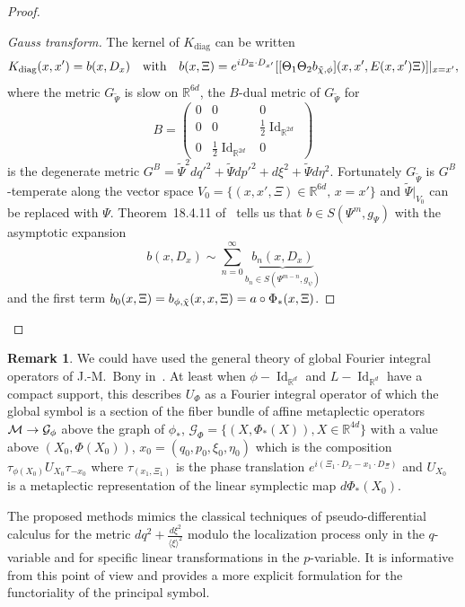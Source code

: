 \documentclass[10pt]{amsart}
\theoremstyle{definition}\newtheorem{defi}[theo]{Definition}\newtheorem{rema}[theo]{Remark}\newtheorem{exam}[theo]{Example}\newtheorem{exem}[theo]{Example}\newtheorem{nota}[theo]{Notation}
\newcommand{\R}{\mathbb{R}}
\newcommand{\clG}{\mathcal{G}}
\newcommand{\clM}{\mathcal{M}}
\DeclareMathOperator{\Idd}{Id}
\DeclareMathOperator{\diag}{diag}
\let\oldtilde\tilde
\renewcommand*{\tilde}[1]{\mathchoice{\widetilde{#1}}{\widetilde{#1}}{\oldtilde{#1}}{\oldtilde{#1}}}
\let\originalleft\left
\let\originalright\right
\renewcommand{\left}{\mathopen{}\mathclose\bgroup\originalleft}
\renewcommand{\right}{\aftergroup\egroup\originalright}
\renewcommand*{\to}{\mathchoice{\longrightarrow}{\rightarrow}{\rightarrow}{\rightarrow}}
\begin{document}
\begin{proof}
\begin{proof}[{Gauss transform}]
The kernel of $K_{\diag}$ can be written
\[
K_{\diag}(x,x')=b(x,D_{x})\quad\text{with}\quad b(x,\Xi)=e^{iD_{\Xi}\cdot
D_{x'}}
\left[[\Theta_{1}\Theta_{2}b_{\tilde\chi,\phi}](x,x',E(x,x')\Xi)\right]|_{x=x'},
\]
where the metric $G_{\widetilde{\Psi}}$ is slow on $\R^{6d}$, the $B$-dual metric of $G_{\widetilde{\Psi}}$ for
\[
B=
\begin{pmatrix}
0&0&0\\
0&0&\frac{1}{2}\Idd_{\R^{2d}}\\
0&\frac{1}{2}\Idd_{\R^{2d}}&0
\end{pmatrix}
\]
is the degenerate metric $G^{B}=\widetilde{\Psi}^{2}dq'^{2}+\widetilde{\Psi}dp'^{2}+d\xi^{2}+\widetilde{\Psi}d\eta^{2}$. Fortunately $G_{\widetilde{\Psi}}$ is $G^{B}$-temperate along the vector space $V_{0}=\{(x,x',\Xi)\in \R^{6d},\, x=x'\}$ and $\widetilde{\Psi}|_{V_{0}}$ can be replaced with $\Psi$. Theorem~18.4.11 of~\cite{HormIII} tells us that $b\in S(\Psi^{m},g_{\Psi})$ with the asymptotic expansion
\[
b(x,D_{x})\sim \sum_{n=0}^{\infty}\underbrace{b_{n}(x,D_{x})}_{b_{n}\in S(\Psi^{m-n},g_{\psi})}
\]
and the first term $b_{0}(x,\Xi)=b_{\phi,\tilde\chi}(x,x,\Xi)=a\circ\Phi_{*}(x,\Xi)$.
\end{proof}
\let\qed\relax
\end{proof}

\begin{rema}
We could have used the general theory of global Fourier integral operators of J.-M.~Bony in~\cite{Bon}. At least when $\phi-\Idd_{\R^{d}}$ and $L-\Idd_{\R^{d}}$ have a compact support, this describes $U_{\Phi}$ as a Fourier integral operator of which the global symbol is a section of the fiber bundle of affine metaplectic operators $\clM\to \clG_{\phi}$ above the graph of $\phi_{*}$, $\clG_{\Phi}=\{(X,\Phi_{*}(X)), X\in \R^{4d}\}$ with a value above $(X_{0},\Phi(X_{0}))$, $x_{0}=(q_{0},p_{0},\xi_{0},\eta_{0})$ which is the composition $\tau_{\phi(X_{0})}U_{X_{0}}\tau_{-x_{0}}$ where $\tau_{(x_{1},\Xi_{1})}$ is the phase translation $e^{i(\Xi_{1}\cdot D_{x}-x_{1}\cdot D_{\Xi})}$ and $U_{X_{0}}$ is a metaplectic representation of the linear symplectic map $d\Phi_{*}(X_{0})$.

The proposed methods mimics the classical techniques of pseudo-differential calculus for the metric $dq^{2}+\frac{d\xi^{2}}{\langle \xi\rangle^{2}}$ modulo the localization process only in the $q$-variable and for specific linear transformations in the $p$-variable. It is informative from this point of view and provides a more explicit formulation for the functoriality of the principal symbol.
\end{rema}
\end{document}
